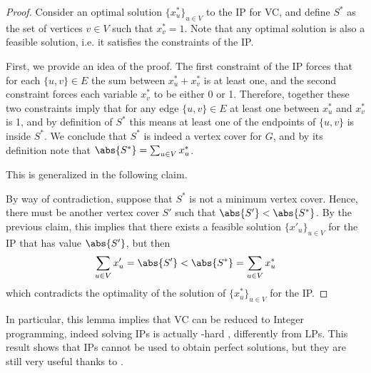 \documentclass[a4paper, 12pt]{report}
\begin{document}
    \begin{proof}
        Consider an optimal solution $\{x^*_u\}_{u \in V}$ to the IP for VC, and define $S^*$ as the set of vertices $v \in V$ such that $x^*_v = 1$. Note that any optimal solution is also a feasible solution, i.e. it satisfies the constraints of the IP.

        First, we provide an idea of the proof. The first constraint of the IP forces that for each $\{u, v\} \in E$ the sum between $x^*_u + x^*_v$ is at least one, and the second constraint forces each variable $x_v^*$ to be either 0 or 1. Therefore, together these two constraints imply that for any edge $\{u, v\} \in E$ at least one between $x_u^*$ and $x_v^*$ is 1, and by definition of $S^*$ this means at least one of the endpoints of $\{u, v\}$ is inside $S^*$. We conclude that $S^*$ is indeed a vertex cover for $G$, and by its definition note that $\abs{S^*} = \sum_{u \in V}{x^*_u}$.

        This is generalized in the following claim.


        By way of contradiction, suppose that $S^*$ is not a minimum vertex cover. Hence, there must be another vertex cover $S'$ such that $\abs{S'} < \abs{S^*}$. By the previous claim, this implies that there exists a feasible solution $\{x'_u\}_{u \in V}$ for the IP that has value $\abs{S'}$, but then $$\sum_{u \in V}{x'_u} = \abs{S'} < \abs{S^*} = \sum_{u \in V}{x^*_u}$$ which contradicts the optimality of the solution of $\{x^*_u\}_{u \in V}$ for the IP.
    \end{proof}

    In particular, this lemma implies that VC can be reduced to Integer programming, indeed solving IPs is actually \NPclass-hard \cite{karp}, differently from LPs. This result shows that IPs cannot be used  to obtain perfect solutions, but they are still very useful thanks to .
\end{document}

